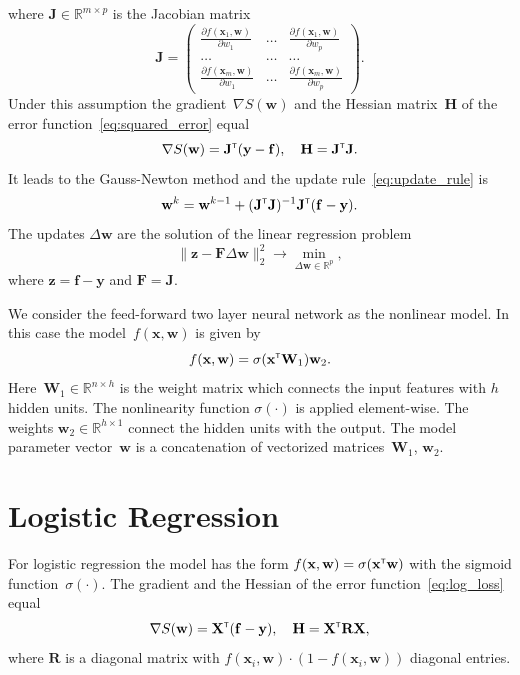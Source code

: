 \documentclass[
11pt,%
tightenlines,%
twoside,%
onecolumn,%
nofloats,%
nobibnotes,%
nofootinbib,%
superscriptaddress,%
noshowpacs,%
centertags]%
{revtex4}
\newcommand{\bw}{\mathbf{w}}
\newcommand{\by}{\mathbf{y}}
\newcommand{\bx}{\mathbf{x}}
\newcommand{\bz}{\mathbf{z}}
\newcommand{\bJ}{\mathbf{J}}
\newcommand{\bbR}{\mathbb{R}}
\newcommand{\bW}{\mathbf{W}}
\newcommand{\bH}{\mathbf{H}}
\newcommand{\bF}{\mathbf{F}}
\newcommand{\bR}{\mathbf{R}}
\newcommand{\bX}{\mathbf{X}}
\newcommand{\T}{{\text{\tiny\sffamily\upshape\mdseries T}}}
\begin{document}
where $\mathbf{J} \in \bbR^{m \times p}$ is the Jacobian matrix
\begin{equation}
\bJ = 
\begin{pmatrix}
\frac{\partial f(\bx_1 , \bw)}{\partial w_1} & \dots & 
\frac{\partial f(\bx_1 , \bw)}{\partial w_p} \\
\dots & \dots & \dots \\
\frac{\partial f(\bx_m , \bw)}{\partial w_1} & \dots & 
\frac{\partial f(\bx_m , \bw)}{\partial w_p}
\end{pmatrix}.
\end{equation}
Under this assumption the gradient~$\nabla S(\bw)$ and the Hessian matrix~$\bH$ of the error function~\eqref{eq:squared_error} equal
\begin{equation}
\nabla S(\bw) = \bJ^{\T} (\by - \mathbf{f}), \quad \bH = \bJ^{\T} \bJ.
\label{eq:nonlin_reg_deriv}
\end{equation}
It leads to the Gauss-Newton method and the update rule~\eqref{eq:update_rule} is 
\[
\bw^k = \bw^{k - 1} + (\bJ^{\T} \bJ)^{-1}\bJ^{\T}(\mathbf{f} - \by).
\]
The updates $\Delta \bw$ are the solution of the linear regression problem
\begin{equation}
\| \bz - \bF \Delta \bw \|_2^2 \rightarrow \min_{\Delta \bw \in \bbR^{p}},
\label{eq:lin_reg_nonlin_reg}
\end{equation}
where $\bz = \mathbf{f} - \by$ and $\bF = \bJ$.

We consider the feed-forward two layer neural network as the nonlinear model. In this case the model~$f(\bx, \bw)$ is given by
\[
f(\bx, \bw) = \sigma(\bx^{\T} \bW_1) \bw_2.
\]
Here~$\bW_1 \in \bbR^{n \times h}$ is the weight matrix which connects the input features with $h$ hidden units. The nonlinearity function $\sigma(\cdot)$ is applied element-wise. The weights $\bw_2 \in \bbR^{h \times 1}$ connect the hidden units with the output. 
The model parameter vector~$\bw$ is a concatenation of vectorized matrices~$\bW_1$, $\bw_2$.

\section{Logistic Regression}
	For logistic regression the model has the form $f(\bx , \bw) = \sigma(\bx^{\T} \bw)$ with the sigmoid function~$\sigma(\cdot)$.
The gradient and the Hessian of the error function~\eqref{eq:log_loss} equal
\begin{equation}
\nabla S(\bw) = \bX^{\T} (\mathbf{f} - \by), \quad \bH = \bX^{\T} \bR \bX,
\label{eq:log_reg_deriv}
\end{equation}
where $\bR$ is a diagonal matrix with $f(\bx_i , \bw) \cdot (1 - f(\bx_i , \bw))$ diagonal entries.
\end{document}
